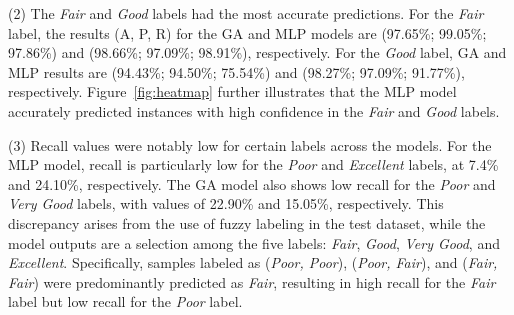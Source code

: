 \documentclass[runningheads]{llncs}
\begin{document}
{%


(2) The \textit{Fair} and \textit{Good} labels had the most accurate predictions. For the \textit{Fair} label, the results (A, P, R) for the GA and MLP models are (97.65\%; 99.05\%; 97.86\%) and (98.66\%; 97.09\%; 98.91\%), respectively. For the \textit{Good} label, GA and MLP results are (94.43\%; 94.50\%; 75.54\%) and (98.27\%; 97.09\%; 91.77\%), respectively. Figure~\ref{fig:heatmap} further illustrates that the MLP model accurately predicted instances with high confidence in the \textit{Fair} and \textit{Good} labels.





(3) Recall values were notably low for certain labels across the models. For the MLP model, recall is particularly low for the \textit{Poor} and \textit{Excellent} labels, at 7.4\% and 24.10\%, respectively. The GA model also shows low recall for the \textit{Poor} and \textit{Very Good} labels, with values of 22.90\% and 15.05\%, respectively. This discrepancy arises from the use of fuzzy labeling in the test dataset, while the model outputs are a selection among the five labels: \textit{Fair}, \textit{Good}, \textit{Very Good}, and \textit{Excellent}. Specifically, samples labeled as (\textit{Poor, Poor}), (\textit{Poor, Fair}), and (\textit{Fair, Fair}) were predominantly predicted as \textit{Fair}, resulting in high recall for the \textit{Fair} label but low recall for the \textit{Poor} label.


}
\end{document}
